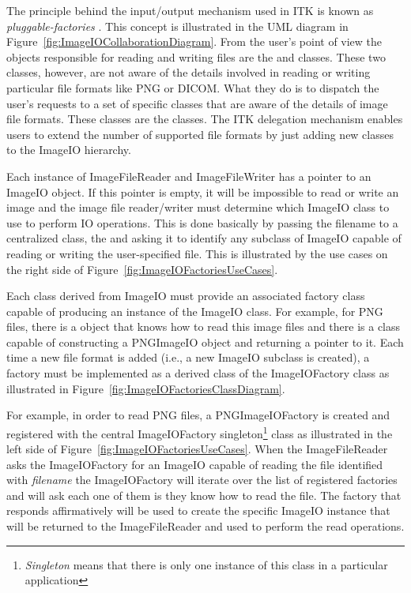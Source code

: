 The principle behind the input/output mechanism used in ITK is known as
\emph{pluggable-factories} \cite{Gamma1995}. This concept is illustrated in
the UML diagram in Figure~\ref{fig:ImageIOCollaborationDiagram}. From the
user's point of view the objects responsible for reading and writing files
are the  and 
classes. These two classes, however, are not aware of the details involved in
reading or writing particular file formats like PNG or DICOM.  What they do
is to dispatch the user's requests to a set of specific classes that are
aware of the details of image file formats. These classes are the
 classes. The ITK delegation mechanism enables users to
extend the number of supported file formats by just adding new classes to the
ImageIO hierarchy.

Each instance of ImageFileReader and ImageFileWriter has
a pointer to an ImageIO object. If this pointer is empty, it will
be impossible to read or write an image and the image file reader/writer must
determine which ImageIO class to use to perform IO operations.
This is done basically by passing the filename to a centralized class, the
 and asking it to identify any subclass of
ImageIO capable of reading or writing the user-specified file. This
is illustrated by the use cases on the right side of
Figure~\ref{fig:ImageIOFactoriesUseCases}.

Each class derived from ImageIO must provide an associated factory
class capable of producing an instance of the ImageIO class. For
example, for PNG files, there is a  object that knows how
to read this image files and there is a  class
capable of constructing a PNGImageIO object and returning a pointer
to it.  Each time a new file format is added (i.e., a new ImageIO
subclass is created), a factory must be implemented as a derived class of the
ImageIOFactory class as illustrated in
Figure~\ref{fig:ImageIOFactoriesClassDiagram}.

For example, in order to read PNG files, a PNGImageIOFactory is
created and registered with the central ImageIOFactory
singleton\footnote{\emph{Singleton} means that there is only one instance of
this class in a particular application} class as illustrated in the left side
of Figure~\ref{fig:ImageIOFactoriesUseCases}. When the ImageFileReader asks
the ImageIOFactory for an ImageIO capable of reading the
file identified with \emph{filename} the ImageIOFactory will iterate over the
list of registered factories and will ask each one of them is they know how
to read the file. The factory that responds affirmatively will be used to
create the specific ImageIO instance that will be returned to the
ImageFileReader and used to perform the read operations.

